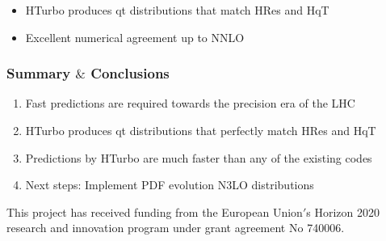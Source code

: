 \documentclass[aspectratio=43]{beamer}
\begin{document}
\begin{frame}
\begin{itemize}
	\item HTurbo produces qt distributions that match HRes and HqT
	\item Excellent numerical agreement up to NNLO
\end{itemize}

\end{frame}

\begin{frame}
	
	\frametitle{Summary $\&$ Conclusions}

	\vspace{2.0 cm}
	
	\begin{enumerate}
		\item Fast predictions are required towards the precision era of the LHC
		\item HTurbo produces qt distributions that perfectly match HRes and HqT
		\item Predictions by HTurbo are much faster than any of the existing codes
		\item Next steps: Implement PDF evolution N3LO distributions

	\end{enumerate}

	\vspace{2.0 cm}

	{\small \color{blue} This project has received funding from the European Union$'$s Horizon 2020 research and innovation program under grant agreement No 740006.}

\end{frame}
\end{document}

